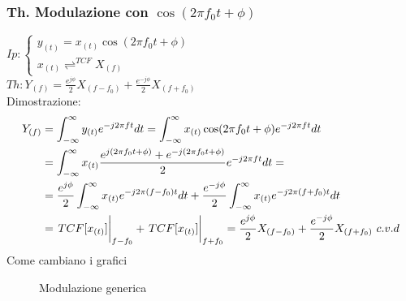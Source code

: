         \subsubsection{Th. Modulazione con $\cos(2\pi f_0t + \phi)$}\label{Modulazione con coseno generico}
            $Ip: \begin{cases}
                y_{(t)}= x_{(t)}\cos(2\pi f_0t + \phi)\\        
                x_{(t)}\rightleftharpoons^{TCF} X_{(f)}
                \end{cases}$\\
            $Th: Y_{(f)} = \frac{e^{j\phi}}{2} X_{(f-f_0)} + \frac{e^{-j\phi}}{2} X_{(f+f_0)} $ \\
            Dimostrazione: 
            \begin{align}
                Y_{(f)} & = \int_{-\infty}^{\infty} y_{(t)} e^{-j2\pi ft} dt = \int_{-\infty}^{\infty} x_{(t)}\cos(2\pi f_0t + \phi) e^{-j2\pi ft} dt \nonumber \\
                & =\int_{-\infty}^{\infty} x_{(t)} \frac{e^{j(2\pi f_0t+ \phi)} + e^{-j(2\pi f_0t+ \phi)}}{2} e^{-j2\pi ft} dt =  \nonumber \\
                & = \frac{e^{j\phi}}{2} \int_{-\infty}^{\infty} x_{(t)} e^{-j2\pi (f-f_0)t} dt + \frac{e^{-j\phi}}{2} \int_{-\infty}^{\infty} x_{(t)} e^{-j2\pi (f+f_0)t} dt \nonumber \\
                & = \eval{TCF[x_{(t)}]}_{f-f_0} + \eval{TCF[x_{(t)}]}_{f+f_0} = \frac{e^{j\phi}}{2} X_{(f-f_0)} + \frac{e^{-j\phi}}{2} X_{(f+f_0)}\ c.v.d \nonumber  
            \end{align}
            Come cambiano i grafici
            \begin{figure}[H]
                \centering
                \hfill
                \caption{Modulazione generica}
            \end{figure}

